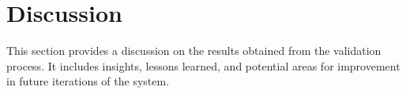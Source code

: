 


\section{Discussion}\label{sec:discuss}
This section provides a discussion on the results obtained from the validation process.
It includes insights, lessons learned, and potential areas for improvement in future iterations of the system.

